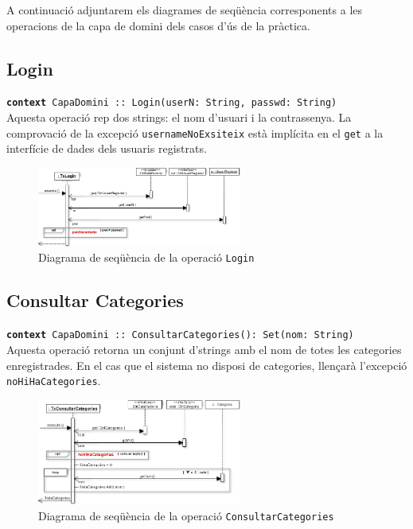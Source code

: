 A continuació adjuntarem els diagrames de seqüència corresponents a les operacions de la capa de domini dels casos d'ús de la pràctica.

\subsection{Login}
\texttt{\textbf{context} CapaDomini :: Login(userN: String, passwd: String)}\\
Aquesta operació rep dos strings: el nom d'usuari i la contrassenya. La comprovació de la excepció \texttt{usernameNoExsiteix} està implícita en el \texttt{get} a la interfície de dades dels usuaris registrats.\\

    \begin{figure}[h]
    \centering
    \includegraphics[width=0.6\textwidth]{figures/login.png}
    \caption{Diagrama de seqüència de la operació \texttt{Login}}
    \end{figure}

\subsection{Consultar Categories}
\texttt{\textbf{context} CapaDomini :: ConsultarCategories(): Set(nom: String)}\\
Aquesta operació retorna un conjunt d'strings amb el nom de totes les categories enregistrades. En el cas que el sistema no disposi de categories, llençarà l'excepció \texttt{noHiHaCategories}.\\

    \begin{figure}[h]
    \centering
    \includegraphics[width=0.6\textwidth]{figures/consultarCategories.png}
    \caption{Diagrama de seqüència de la operació \texttt{ConsultarCategories}}
    \end{figure}

